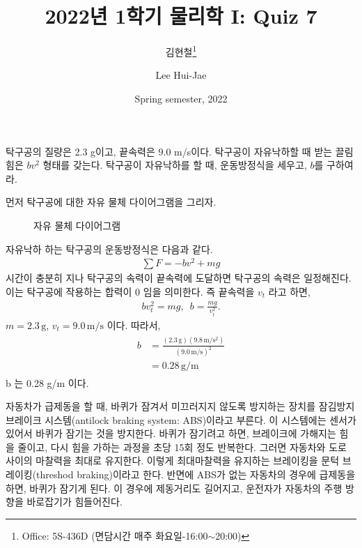 \documentclass[floatfix,nofootinbib,superscriptaddress,fleqn]{revtex4-2}
\begin{document}
\title{\Large 2022년 1학기 물리학 I: Quiz 7}
\author{김현철\footnote{Office: 5S-436D (면담시간 매주
    화요일-16:00$\sim$20:00)}} 
\author{Lee Hui-Jae} 
\date{Spring semester, 2022}


\vspace{1.cm}
\maketitle

탁구공의 질량은 2.3 g이고, 끝속력은 $9.0$ m/s이다. 탁구공이 자유낙하할
때 받는 끌림힘은 $bv^2$ 형태를 갖는다. 탁구공이 자유낙하를 할 때,
운동방정식을 세우고, $b$를 구하여라.  

 먼저 탁구공에 대한 자유 물체 다이어그램을 그리자.
\begin{figure}[htp]
  \centering
  \caption{자유 물체 다이어그램}
  \label{fig:1}
\end{figure}

자유낙하 하는 탁구공의 운동방정식은 다음과 같다.
\begin{align}
  \sum F = -bv^2+mg
\end{align}
시간이 충분히 지나 탁구공의 속력이 끝속력에 도달하면 탁구공의 속력은 
일정해진다. 이는 탁구공에 작용하는 합력이 0 임을 의미한다. 즉 끝속력을
$v_t$ 라고 하면,
\begin{align}
  bv_t^2 = mg,\,\,\, b =\frac{mg}{v_t^2}.
\end{align}
$m = 2.3\,\mathrm{g}$, $v_t = 9.0\,\mathrm{m/s}$ 이다. 따라서,
\begin{align}
  \begin{split}
    b &= \frac{(2.3\,\mathrm{g})(9.8\,\mathrm{m/s^2})}{( 9.0\,\mathrm{m/s})^2}  \\
    &= 0.28\,\mathrm{g/m}
  \end{split}
  \end{align}
  b 는 0.28 g/m 이다.
\vspace{1.cm}

 자동차가 급제동을 할 때, 바퀴가
잠겨서 미끄러지지 않도록 방지하는 장치를 잠김방지 브레이크
시스템(antilock braking system: ABS)이라고 부른다. 이 시스템에는
센서가 있어서 바퀴가 잠기는 것을 방지한다. 바퀴가 잠기려고 하면,
브레이크에 가해지는 힘을 줄이고, 다시 힘을 가하는 과정을 초당 15회
정도 반복한다. 그러면 자동차와 도로 사이의 마찰력을 최대로
유지한다. 이렇게 최대마찰력을 유지하는 브레이킹을 문턱
브레이킹(threshod braking)이라고 한다.
반면에 ABS가 없는 자동차의 경우에 급제동을 하면, 바퀴가
잠기게 된다. 이 경우에 제동거리도 길어지고, 운전자가 자동차의 주행
방향을 바로잡기가 힘들어진다.
\end{document}

